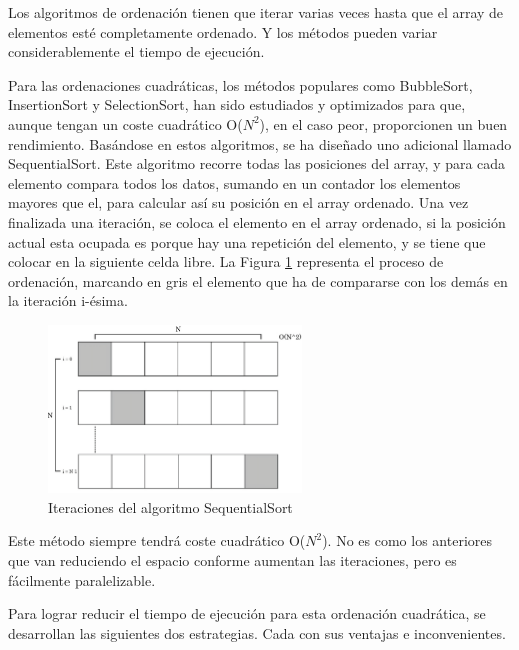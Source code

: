 	\newpage	
	
	Los algoritmos de ordenación tienen que iterar varias veces hasta que el array de elementos esté completamente ordenado. Y los métodos pueden variar considerablemente el tiempo de ejecución.
	
	Para las ordenaciones cuadráticas, los métodos populares como BubbleSort, InsertionSort y SelectionSort, han sido estudiados y optimizados para que, aunque tengan un coste cuadrático O(\(N^{2}\)), en el caso peor, proporcionen un buen rendimiento. Basándose en estos algoritmos, se ha diseñado uno adicional llamado SequentialSort. Este algoritmo recorre todas las posiciones del array, y para cada elemento compara todos los datos, sumando en un contador los elementos mayores que el, para calcular así su posición en el array ordenado. Una vez finalizada una iteración, se coloca el elemento en el array ordenado, si la posición actual esta ocupada es porque hay una repetición del elemento, y se tiene que colocar en la siguiente celda libre. La Figura \ref{fig:sequentialsortmpi} representa el proceso de ordenación, marcando en gris el elemento que ha de compararse con los demás en la iteración i-ésima.
	
	\newpage

	\begin{figure}[!h]
		\centering
		\includegraphics[width=0.6\textwidth]{images/chapter_3/sequentialsort_mpi}
		\caption{Iteraciones del algoritmo SequentialSort}
		\label{fig:sequentialsortmpi}
	\end{figure}
	
	Este método siempre tendrá coste cuadrático O(\(N^{2}\)). No es como los anteriores que van reduciendo el espacio conforme aumentan las iteraciones, pero es fácilmente paralelizable. 
	
	Para lograr reducir el tiempo de ejecución para esta ordenación cuadrática, se desarrollan las siguientes dos estrategias. Cada con sus ventajas e inconvenientes.
	
